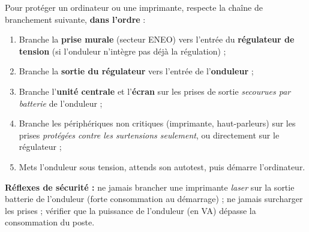 \documentclass[11pt]{article}
\begin{document}
\begin{methode}
Pour protéger un ordinateur ou une imprimante, respecte la chaîne de branchement suivante, \textbf{dans l'ordre} :
\begin{enumerate}
\item Branche la \textbf{prise murale} (secteur ENEO) vers l'entrée du \textbf{régulateur de tension} (si l'onduleur n'intègre pas déjà la régulation) ;
\item Branche la \textbf{sortie du régulateur} vers l'entrée de l'\textbf{onduleur} ;
\item Branche l'\textbf{unité centrale} et l'\textbf{écran} sur les prises de sortie \emph{secourues par batterie} de l'onduleur ;
\item Branche les périphériques non critiques (imprimante, haut-parleurs) sur les prises \emph{protégées contre les surtensions seulement}, ou directement sur le régulateur ;
\item Mets l'onduleur sous tension, attends son autotest, puis démarre l'ordinateur.
\end{enumerate}
\textbf{Réflexes de sécurité :} ne jamais brancher une imprimante \emph{laser} sur la sortie batterie de l'onduleur (forte consommation au démarrage) ; ne jamais surcharger les prises ; vérifier que la puissance de l'onduleur (en VA) dépasse la consommation du poste.
\end{methode}
\end{document}
